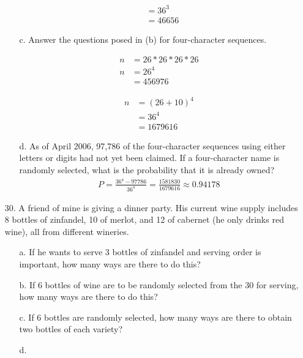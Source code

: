 \documentclass[letterpaper,12pt]{article}
\begin{document}
\begin{enumerate}
\begin{enumerate}
\begin{minipage}{.5\linewidth}
\begin{align*}
            &= 36^3 \\
            &= 46656
          \end{align*}
        \end{minipage}
      \item[c.]
        Answer the questions posed in (b) for four-character sequences.
        \begin{minipage}{.5\linewidth}
          \begin{align*}
            n &= 26 * 26 * 26 * 26 \\
            n &= 26^4 \\
            &= 456976
          \end{align*}
        \end{minipage}%
        \begin{minipage}{.5\linewidth}
          \begin{align*}
            n &= (26 + 10)^4 \\
            &= 36^4 \\
            &= 1679616
          \end{align*}
        \end{minipage}
      \item[d.]
        As of April 2006, 97,786 of the four-character sequences using either letters or digits had not yet been claimed. If a four-character name is randomly selected, what is the probability that it is already owned?
        \begin{align*}
          P = \frac{36^4 - 97786}{36^4} = \frac{1581830}{1679616} \approx 0.94178
        \end{align*}
    \end{enumerate}
  \item[30.]
    A friend of mine is giving a dinner party. His current wine supply includes 8 bottles of zinfandel, 10 of merlot, and 12 of cabernet (he only drinks red wine), all from different wineries.
    \begin{enumerate}
      \item[a.]
        If he wants to serve 3 bottles of zinfandel and serving order is important, how many ways are there to do this?
      \item[b.]
        If 6 bottles of wine are to be randomly selected from the 30 for serving, how many ways are there to do this?
      \item[c.]
        If 6 bottles are randomly selected, how many ways are there to obtain two bottles of each variety?
      \item[d.]

\end{enumerate}
\end{enumerate}
\end{document}
